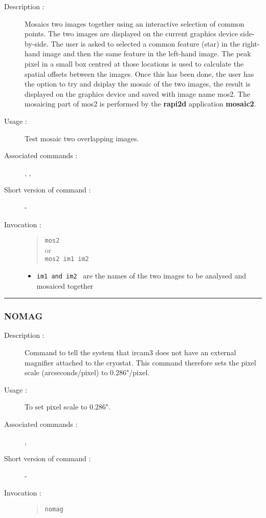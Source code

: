 \begin{description}

\item[Description :] Mosaics two images together using an interactive
selection of common points.  The two images are displayed on the
current graphics device side-by-side.  The user is asked to selected a
common feature (star) in the right-hand image and then the same feature
in the left-hand image. The peak pixel in a small box centred at those
locations is used to calculate the spatial offsets between the images.
Once this has been done, the user has the option to try and dsiplay the
mosaic of the two images, the result is displayed on the graphics
device and saved with image name mos2.  The mosaicing part of mos2 is
performed by the {\bf rapi2d} application {\bf mosaic2}.

\item[Usage :] Test mosaic two overlapping images.
\item[Associated commands :] {\tt {}}, 
{\tt {}}, {\tt {}}
\item[Short version of command :] -
\item[Invocation :]

\begin{quote}{\tt  mos2 }\\
or \\
{\tt mos2 im1 im2 }
\end{quote}

\begin{itemize}

\item {\tt im1 and im2 } are the names of the two images to be analysed
 and mosaiced together
\end{itemize}

\end{description}

\hrule 
\subsubsection*{\label{NOMAG}NOMAG}

\begin{description}

\item[Description :] Command to tell the system that {\sc ircam3} does not 
have an external magnifier attached to the cryostat.  This command therefore 
sets the pixel scale (arcseconds/pixel) to 0.286"/pixel.

\item[Usage :] To set pixel scale to 0.286".
\item[Associated commands :] {\tt {}}, 
{\tt {}}
\item[Short version of command :] -
\item[Invocation :]

\begin{quote}{\tt  nomag }\end{quote}

\end{description}

